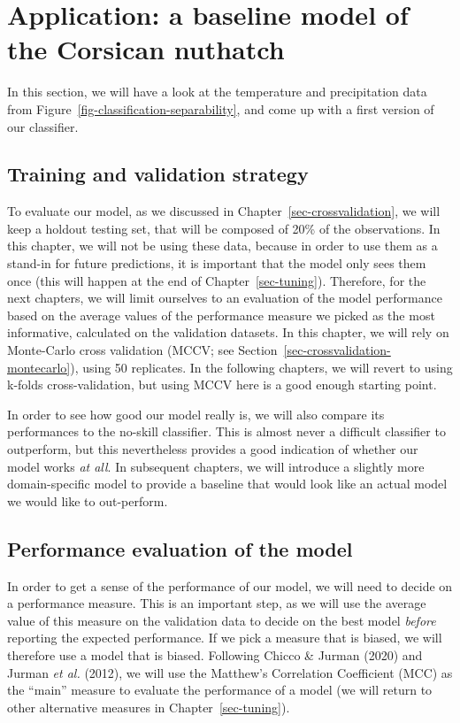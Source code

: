 \documentclass[
  letterpaper,
]{scrbook}
\begin{document}
\section{Application: a baseline model of the Corsican
nuthatch}\label{application-a-baseline-model-of-the-corsican-nuthatch}

In this section, we will have a look at the temperature and
precipitation data from Figure~\ref{fig-classification-separability},
and come up with a first version of our classifier.

\subsection{Training and validation
strategy}\label{training-and-validation-strategy}

To evaluate our model, as we discussed in
Chapter~\ref{sec-crossvalidation}, we will keep a holdout testing set,
that will be composed of 20\% of the observations. In this chapter, we
will not be using these data, because in order to use them as a stand-in
for future predictions, it is important that the model only sees them
once (this will happen at the end of Chapter~\ref{sec-tuning}).
Therefore, for the next chapters, we will limit ourselves to an
evaluation of the model performance based on the average values of the
performance measure we picked as the most informative, calculated on the
validation datasets. In this chapter, we will rely on Monte-Carlo cross
validation (MCCV; see Section~\ref{sec-crossvalidation-montecarlo}),
using 50 replicates. In the following chapters, we will revert to using
k-folds cross-validation, but using MCCV here is a good enough starting
point.

In order to see how good our model really is, we will also compare its
performances to the no-skill classifier. This is almost never a
difficult classifier to outperform, but this nevertheless provides a
good indication of whether our model works \emph{at all}. In subsequent
chapters, we will introduce a slightly more domain-specific model to
provide a baseline that would look like an actual model we would like to
out-perform.

\subsection{Performance evaluation of the
model}\label{performance-evaluation-of-the-model}

In order to get a sense of the performance of our model, we will need to
decide on a performance measure. This is an important step, as we will
use the average value of this measure on the validation data to decide
on the best model \emph{before} reporting the expected performance. If
we pick a measure that is biased, we will therefore use a model that is
biased. Following Chicco \& Jurman (2020) and Jurman \emph{et al.}
(2012), we will use the Matthew's Correlation Coefficient (MCC) as the
``main'' measure to evaluate the performance of a model (we will return
to other alternative measures in Chapter~\ref{sec-tuning}).
\end{document}
